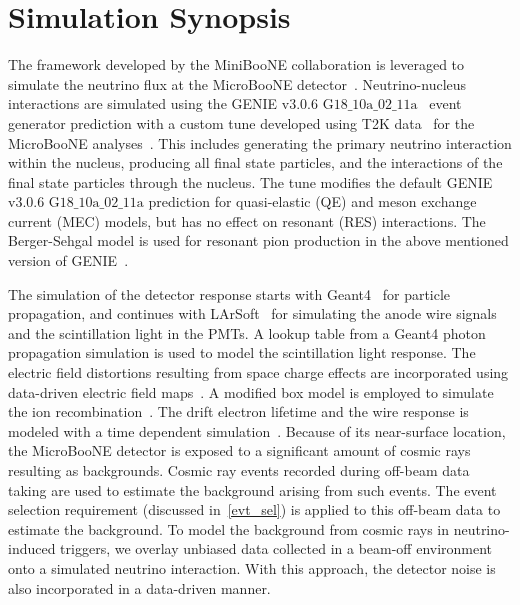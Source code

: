 \documentclass[%
 reprint,
 amsmath,amssymb, longbibliography,
 aps, 
 prd,
 twocolumn,
 showpacs,
 superscriptaddress
]{revtex4-2}
\begin{document}
\section{Simulation Synopsis}
The framework developed by the MiniBooNE collaboration is leveraged to simulate the neutrino flux at the MicroBooNE detector~\cite{PhysRevD.79.072002}. Neutrino-nucleus interactions are simulated using the GENIE $\text{v3.0.6 G18\_10a\_02\_11a}$~\cite{GENIEV3} event generator prediction with a custom tune developed using T2K data~\cite{PhysRevD.105.072001} for the MicroBooNE analyses~\cite{PhysRevLett.128.151801}. This includes generating the primary neutrino interaction within the nucleus, producing all final state particles, and the interactions of the final state particles through the nucleus. The tune modifies the default GENIE $\text{v3.0.6 G18\_10a\_02\_11a}$ prediction for quasi-elastic (QE) and meson exchange current (MEC) models, but has no effect on resonant (RES) interactions. The Berger-Sehgal model is used for resonant pion production in the above mentioned version of GENIE~\cite{10.1063/1.3274164,PhysRevD.76.113004,PhysRevD.79.079903}. 

The simulation of the detector response starts with Geant4~\cite{AGOSTINELLI2003250} for particle propagation, and continues with LArSoft~\cite{Snider_2017} for simulating the anode wire signals and the scintillation light in the PMTs. A lookup table from a Geant4 photon propagation simulation is used to model the scintillation light response. The electric field distortions resulting from space charge effects are incorporated using data-driven electric field maps~\cite{Adams_2020,Abratenko_2020}. A modified box model is employed to simulate the ion recombination~\cite{R_Acciarri_2013}. The drift electron lifetime and the wire response is modeled with a time dependent simulation~\cite{Adams_2018_1, Adams_2018_2,R_Acciarri_2013}. Because of its near-surface location, the MicroBooNE detector is exposed to a significant amount of cosmic rays resulting as backgrounds. Cosmic ray events recorded during off-beam data taking are used to estimate the background arising from such events. The event selection requirement (discussed in~\ref{evt_sel}) is applied to this off-beam data to estimate the background. To model the background from cosmic rays in neutrino-induced triggers, we overlay unbiased data collected in a beam-off environment onto a simulated neutrino interaction. With this approach, the detector noise is also incorporated in a data-driven manner. %
\end{document}

